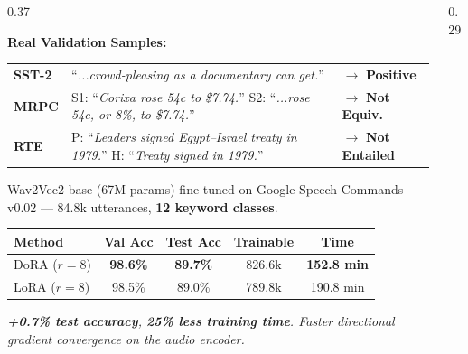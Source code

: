 \documentclass[final]{beamer}
\newcommand{\hl}[1]{\textcolor{CornellRed}{\textbf{#1}}}
\newcommand{\lb}[1]{\textbf{#1:}\;}
\begin{document}
\begin{frame}[t]
\begin{columns}[T,totalwidth=\textwidth]
\begin{column}{0.37\textwidth}
\begin{tcolorbox}[posterblock,title=NLP Results — GLUE Benchmark]
  \vspace{0.1cm}
  \lb{Real Validation Samples}
  {\footnotesize
  \begin{tabular}{@{}lp{5.3cm}l@{}}
    \textbf{SST-2} & ``\textit{...crowd-pleasing as a documentary can get.}'' & $\to$ \hl{Positive} \\[1pt]
    \textbf{MRPC}  & S1: ``\textit{Corixa rose 54c to \$7.74.}'' S2: ``\textit{...rose 54c, or 8\%, to \$7.74.}'' & $\to$ \hl{Not Equiv.} \\[1pt]
    \textbf{RTE}   & P: ``\textit{Leaders signed Egypt--Israel treaty in 1979.}'' H: ``\textit{Treaty signed in 1979.}'' & $\to$ \hl{Not Entailed} \\
  \end{tabular}}
\end{tcolorbox}

\begin{tcolorbox}[posterblock,title=Audio Results — Speech Commands]
  Wav2Vec2-base (67M params) fine-tuned on Google Speech Commands
  v0.02 — 84.8k utterances, \textbf{12 keyword classes}.

  \vspace{0.12cm}
  \begin{center}\small
  \begin{tabular}{@{}lcccc@{}}
    \toprule
    \textbf{Method} & \textbf{Val Acc} & \textbf{Test Acc}
                    & \textbf{Trainable} & \textbf{Time} \\
    \midrule
    \rowcolor{TableShade}
    DoRA ($r=8$) & \textbf{98.6\%} & \textbf{89.7\%}
                 & 826.6k & \textbf{152.8 min} \\
    LoRA ($r=8$) & 98.5\% & 89.0\%
                 & 789.8k & 190.8 min \\
    \bottomrule
  \end{tabular}
  \end{center}

  \vspace{0.08cm}
  \small\textit{\hl{+0.7\% test accuracy}, \hl{25\% less training time}.
  Faster directional gradient convergence on the audio encoder.}
\end{tcolorbox}

\end{column}

\begin{column}{0.29\textwidth}


\end{column}
\end{columns}
\end{frame}
\end{document}
